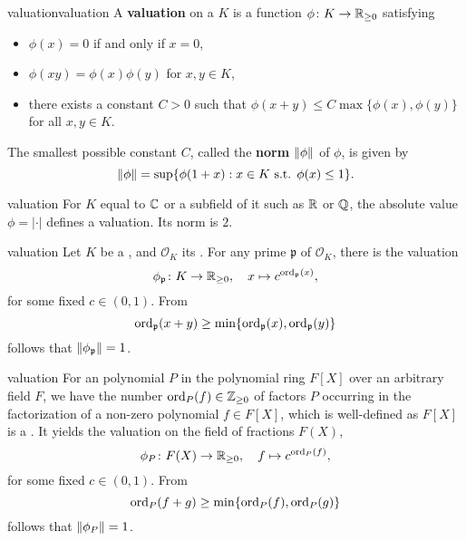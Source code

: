 \begin{topic}{valuation}{valuation}
    A \textbf{valuation} on a  $K$ is a function $\phi \colon K \to \mathbb{R}_{\ge 0}$ satisfying
    \begin{itemize}
        \item $\phi(x) = 0$ if and only if $x = 0$,
        \item $\phi(xy) = \phi(x) \phi(y)$ for $x, y \in K$,
        \item there exists a constant $C > 0$ such that $\phi(x + y) \le C \max \{ \phi(x), \phi(y) \}$ for all $x, y \in K$.
    \end{itemize}
    The smallest possible constant $C$, called the \textbf{norm} $\left\|\phi\right\|$ of $\phi$, is given by
    \[ \left\|\phi\right\| = \sup \{ \phi(1 + x) : x \in K \textup{ s.t. } \phi(x) \le 1 \} . \]
\end{topic}

\begin{example}{valuation}
    For $K$ equal to $\mathbb{C}$ or a subfield of it such as $\mathbb{R}$ or $\mathbb{Q}$, the absolute value $\phi = |\cdot|$ defines a valuation. Its norm is $2$.
\end{example}

\begin{example}{valuation}
    Let $K$ be a , and $\mathcal{O}_K$ its . For any prime $\mathfrak{p}$ of $\mathcal{O}_K$, there is the valuation
    \[ \phi_\mathfrak{p} \colon K \to \mathbb{R}_{\ge 0}, \quad x \mapsto c^{\textup{ord}_\mathfrak{p}(x)} , \]
    for some fixed $c \in (0, 1)$. From
    \[ \textup{ord}_\mathfrak{p}(x + y) \ge \min \{ \textup{ord}_\mathfrak{p}(x), \textup{ord}_\mathfrak{p}(y) \} \]
    follows that $\left\|\phi_\mathfrak{p}\right\| = 1$.
\end{example}

\begin{example}{valuation}
    For an  polynomial $P$ in the polynomial ring $F[X]$ over an arbitrary field $F$, we have the number $\textup{ord}_P(f) \in \mathbb{Z}_{\ge 0}$ of factors $P$ occurring in the factorization of a non-zero polynomial $f \in F[X]$, which is well-defined as $F[X]$ is a . It yields the valuation on the field of fractions $F(X)$,
    \[ \phi_P \colon F(X) \to \mathbb{R}_{\ge 0}, \quad f \mapsto c^{\textup{ord}_P(f)} ,  \]
    for some fixed $c \in (0, 1)$. From
    \[ \textup{ord}_P(f + g) \ge \min \{ \textup{ord}_P(f), \textup{ord}_P(g) \} \]
    follows that $\left\|\phi_P\right\| = 1$.
\end{example}

